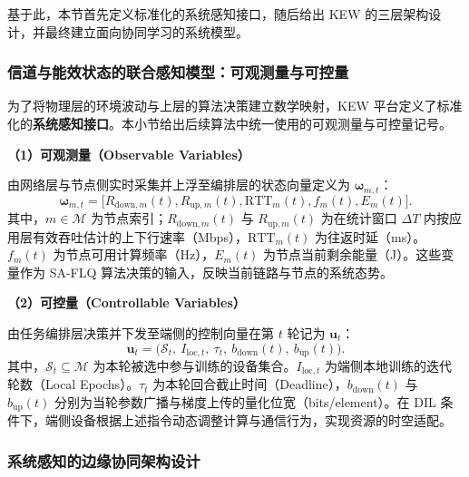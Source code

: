 基于此，本节首先定义标准化的系统感知接口，随后给出 KEW 的三层架构设计，并最终建立面向协同学习的系统模型。

\subsubsection{信道与能效状态的联合感知模型：可观测量与可控量} \label{sec:interface}

为了将物理层的环境波动与上层的算法决策建立数学映射，KEW 平台定义了标准化的\textbf{系统感知接口}。本小节给出后续算法中统一使用的可观测量与可控量记号。

\textbf{（1）可观测量（Observable Variables）}

由网络层与节点侧实时采集并上浮至编排层的状态向量定义为 $\boldsymbol{\omega}_{m,t}$：
\begin{equation}
	\boldsymbol{\omega}_{m,t} = \big[ R_{\text{down},m}(t), R_{\text{up},m}(t), \mathrm{RTT}_{m}(t), f_{m}(t), E_{m}(t) \big].
	\label{eq:kew-omega}
\end{equation}
其中，$m \in \mathcal{M}$ 为节点索引；$R_{\text{down},m}(t)$ 与 $R_{\text{up},m}(t)$ 为在统计窗口 $\Delta T$ 内按应用层有效吞吐估计的上下行速率（Mbps），$\mathrm{RTT}_{m}(t)$ 为往返时延（ms）。$f_{m}(t)$ 为节点可用计算频率（Hz），$E_{m}(t)$ 为节点当前剩余能量（J）。这些变量作为 SA-FLQ 算法决策的输入，反映当前链路与节点的系统态势。

\textbf{（2）可控量（Controllable Variables）}

由任务编排层决策并下发至端侧的控制向量在第 $t$ 轮记为 $\mathbf{u}_t$：
\begin{equation}
	\mathbf{u}_t = \big( \mathcal{S}_t,\ I_{\text{loc},t},\ \tau_t,\ b_{\text{down}}(t),\ b_{\text{up}}(t) \big).
	\label{eq:kew-u}
\end{equation}
其中，$\mathcal{S}_t \subseteq \mathcal{M}$ 为本轮被选中参与训练的设备集合。$I_{\text{loc},t}$ 为端侧本地训练的迭代轮数（Local Epochs）。$\tau_t$ 为本轮回合截止时间（Deadline），$b_{\text{down}}(t)$ 与 $b_{\text{up}}(t)$ 分别为当轮参数广播与梯度上传的量化位宽（bits/element）。在 DIL 条件下，端侧设备根据上述指令动态调整计算与通信行为，实现资源的时空适配。

\subsubsection{系统感知的边缘协同架构设计} \label{sec:kew_arch}

